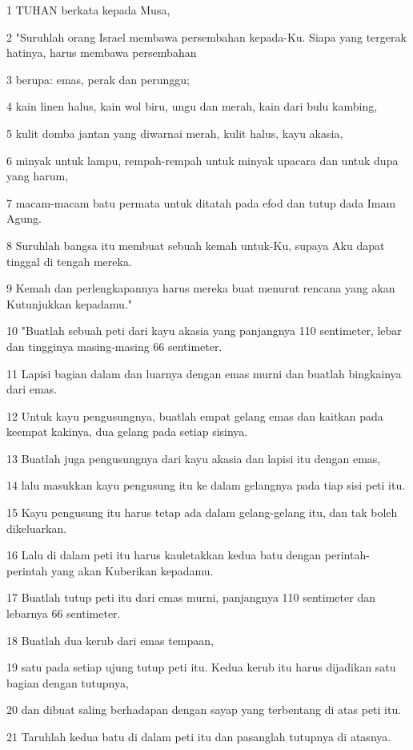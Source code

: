 \par 1 TUHAN berkata kepada Musa,
\par 2 "Suruhlah orang Israel membawa persembahan kepada-Ku. Siapa yang tergerak hatinya, harus membawa persembahan
\par 3 berupa: emas, perak dan perunggu;
\par 4 kain linen halus, kain wol biru, ungu dan merah, kain dari bulu kambing,
\par 5 kulit domba jantan yang diwarnai merah, kulit halus, kayu akasia,
\par 6 minyak untuk lampu, rempah-rempah untuk minyak upacara dan untuk dupa yang harum,
\par 7 macam-macam batu permata untuk ditatah pada efod dan tutup dada Imam Agung.
\par 8 Suruhlah bangsa itu membuat sebuah kemah untuk-Ku, supaya Aku dapat tinggal di tengah mereka.
\par 9 Kemah dan perlengkapannya harus mereka buat menurut rencana yang akan Kutunjukkan kepadamu."
\par 10 "Buatlah sebuah peti dari kayu akasia yang panjangnya 110 sentimeter, lebar dan tingginya masing-masing 66 sentimeter.
\par 11 Lapisi bagian dalam dan luarnya dengan emas murni dan buatlah bingkainya dari emas.
\par 12 Untuk kayu pengusungnya, buatlah empat gelang emas dan kaitkan pada keempat kakinya, dua gelang pada setiap sisinya.
\par 13 Buatlah juga pengusungnya dari kayu akasia dan lapisi itu dengan emas,
\par 14 lalu masukkan kayu pengusung itu ke dalam gelangnya pada tiap sisi peti itu.
\par 15 Kayu pengusung itu harus tetap ada dalam gelang-gelang itu, dan tak boleh dikeluarkan.
\par 16 Lalu di dalam peti itu harus kauletakkan kedua batu dengan perintah-perintah yang akan Kuberikan kepadamu.
\par 17 Buatlah tutup peti itu dari emas murni, panjangnya 110 sentimeter dan lebarnya 66 sentimeter.
\par 18 Buatlah dua kerub dari emas tempaan,
\par 19 satu pada setiap ujung tutup peti itu. Kedua kerub itu harus dijadikan satu bagian dengan tutupnya,
\par 20 dan dibuat saling berhadapan dengan sayap yang terbentang di atas peti itu.
\par 21 Taruhlah kedua batu di dalam peti itu dan pasanglah tutupnya di atasnya.
